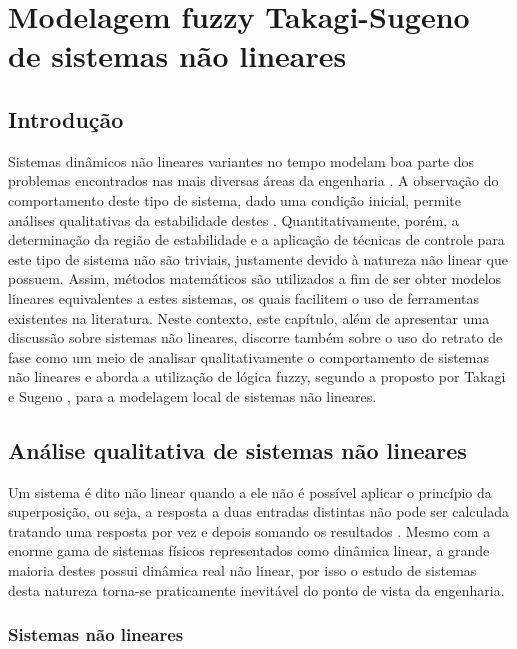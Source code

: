                       

\chapter{Modelagem fuzzy Takagi-Sugeno de sistemas não lineares}\label{cap_ModelagemSisNaoLinearesporFuzzyTS}

\section{Introdução}

Sistemas dinâmicos não lineares variantes no tempo modelam boa parte dos problemas encontrados nas mais diversas áreas da engenharia \cite{bookogata:2003}. A observação do comportamento deste tipo de sistema, dado uma condição inicial, permite análises qualitativas da estabilidade destes \cite{bookkhalil:2003}. Quantitativamente, porém, a determinação da região de estabilidade e a aplicação de técnicas de controle para este tipo de sistema não são triviais, justamente devido à natureza não linear que possuem. Assim, métodos matemáticos são utilizados  a fim de ser obter modelos lineares equivalentes a estes sistemas, os quais facilitem o uso de ferramentas existentes na literatura. Neste contexto, este capítulo, além de apresentar uma discussão sobre sistemas não lineares,  discorre também sobre o uso do retrato de fase como um meio de analisar qualitativamente o comportamento de sistemas não lineares e aborda a utilização de lógica fuzzy, segundo a proposto por Takagi e Sugeno \cite{articlets:1985},  para a modelagem local de sistemas não lineares.

\section{Análise qualitativa de sistemas não lineares} \label{Sist-nao-lin-retrato-fase}

Um sistema é dito não linear quando a ele não é  possível aplicar o princípio da superposição, ou seja, a resposta a duas entradas distintas não pode ser calculada tratando uma resposta por vez e depois somando os resultados \cite{bookogata:2003}. Mesmo com a enorme gama de sistemas físicos representados como dinâmica linear, a grande maioria destes possui dinâmica real não linear, por isso o estudo de sistemas desta natureza torna-se praticamente inevitável do ponto de vista da engenharia.

\subsection{Sistemas não lineares}

